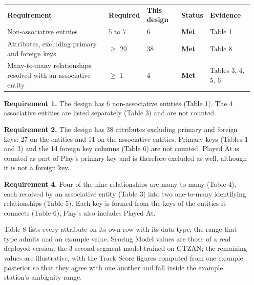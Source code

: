 \documentclass[11pt]{article}
\begin{document}
\begin{longtable}{|L{2.20in}|L{0.75in}|L{0.95in}|L{0.70in}|L{1.45in}|}
\hline
{} \\ \hline
{}\textbf{Requirement} & \textbf{Required} & \textbf{This design} & \textbf{Status} & \textbf{Evidence} \\ \hline
Non-associative entities & 5 to 7 & 6 & \textcolor{relc}{\textbf{Met}} & Table 1 \\ \hline
Attributes, excluding primary and foreign keys & $\geq$ 20 & 38 & \textcolor{relc}{\textbf{Met}} & Table 8 \\ \hline
Many-to-many relationships resolved with an associative entity & $\geq$ 1 & 4 & \textcolor{relc}{\textbf{Met}} & Tables 3, 4, 5, 6 \\ \hline
\end{longtable}

\textbf{Requirement 1.} The design has 6 non-associative entities (Table 1). The 4
associative entities are listed separately (Table 3) and are not counted.

\textbf{Requirement 2.} The design has 38 attributes excluding primary and foreign keys:
27 on the entities and 11 on the associative entities. Primary keys (Tables 1 and 3) and the
14 foreign key columns (Table 6) are not counted. Played At is counted as part of Play's primary key
and is therefore excluded as well, although it is not a foreign key.

\textbf{Requirement 4.} Four of the nine relationships are many-to-many (Table 4), each resolved by
an associative entity (Table 3) into two one-to-many identifying relationships (Table 5). Each key is
formed from the keys of the entities it connects (Table 6); Play's also includes Played At.

Table 8 lists every attribute on its own row with its data type, the range that type
admits and an example value. Scoring Model values are those of a real deployed version, the
3-second segment model trained on GTZAN; the remaining values are illustrative, with the
Track Score figures computed from one example posterior so that they agree with one another
and fall inside the example station's ambiguity range.
\end{document}
